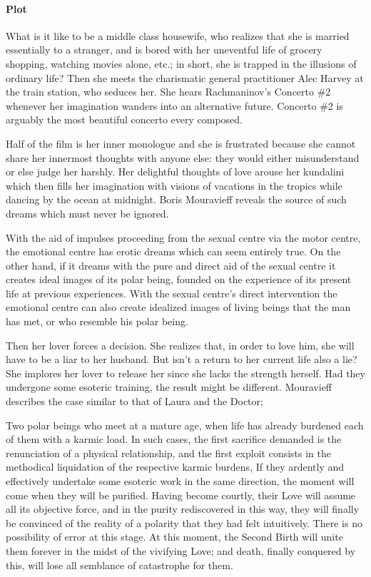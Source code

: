 \paragraph{Plot}


What is it like to be a middle class housewife, who realizes that she is married essentially to a stranger, and is bored with her uneventful life of grocery shopping, watching movies alone, etc.; in short, she is trapped in the illusions of ordinary life? Then she meets the charismatic general practitioner Alec Harvey at the train station, who seduces her. She hears Rachmaninov's Concerto \#2 whenever her imagination wanders into an alternative future. Concerto \#2 is arguably the most beautiful concerto every composed.

Half of the film is her inner monologue and she is frustrated because she cannot share her innermost thoughts with anyone else: they would either misunderstand or else judge her harshly. Her delightful thoughts of love arouse her kundalini which then fills her imagination with visions of vacations in the tropics while dancing by the ocean at midnight. Boris Mouravieff reveals the source of such dreams which must never be ignored.

\begin{quotex}
With the aid of impulses proceeding from the sexual centre via the motor centre, the emotional centre has erotic dreams which can seem entirely true. On the other hand, if it dreams with the pure and direct aid of the sexual centre it creates ideal images of its polar being, founded on the experience of its present life at previous experiences. With the sexual centre's direct intervention the emotional centre can also create idealized images of living beings that the man has met, or who resemble his polar being.
\end{quotex}


Then her lover forces a decision. She realizes that, in order to love him, she will have to be a liar to her husband. But isn't a return to her current life also a lie? She implores her lover to release her since she lacks the strength herself. Had they undergone some esoteric training, the result might be different. Mouravieff describes the case similar to that of Laura and the Doctor;

\begin{quotex}
Two polar beings who meet at a mature age, when life has already burdened each of them with a karmic load. In such cases, the first sacrifice demanded is the renunciation of a physical relationship, and the first exploit consists in the methodical liquidation of the respective karmic burdens, If they ardently and effectively undertake some esoteric work in the same direction, the moment will come when they will be purified. Having become courtly, their Love will assume all its objective force, and in the purity rediscovered in this way, they will finally be convinced of the reality of a polarity that they had felt intuitively. There is no possibility of error at this stage. At this moment, the Second Birth will unite them forever in the midst of the vivifying Love; and death, finally conquered by this, will lose all semblance of catastrophe for them.
\end{quotex}


